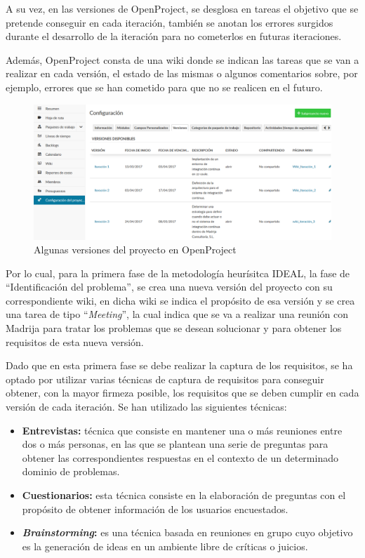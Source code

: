A su vez, en las versiones de OpenProject, se desglosa en tareas el objetivo que se pretende conseguir en cada iteración, también se anotan los errores surgidos durante el desarrollo de la iteración para no cometerlos en futuras iteraciones.

Además, OpenProject consta de una wiki donde se indican las tareas que se van a realizar en cada versión, el estado de las mismas o algunos comentarios sobre, por ejemplo, errores que se han cometido para que no se realicen en el futuro.

\begin{figure}[!h]
\centering
   \includegraphics[width=16cm]{OpenProjectVersiones.PNG}
\caption{Algunas versiones del proyecto en OpenProject}
\end{figure}

Por lo cual, para la primera fase de la metodología heurísitca IDEAL, la fase de ``Identificación del problema'', se crea una nueva versión del proyecto con su correspondiente wiki, en dicha wiki se indica el propósito de esa versión y se crea una tarea de tipo ``\textit{Meeting}'', la cual indica que se va a realizar una reunión con \ac{Madrija} para tratar los problemas que se desean solucionar y para obtener los requisitos de esta nueva versión.

\newpage

Dado que en esta primera fase se debe realizar la captura de los requisitos, se ha optado por utilizar varias técnicas de captura de requisitos para conseguir obtener, con la mayor firmeza posible, los requisitos que se deben cumplir en cada versión de cada iteración. Se han utilizado las siguientes técnicas:
\begin{itemize}
	\item \textbf{Entrevistas\cite{toro2000metodologia}: } técnica que consiste en mantener una o más reuniones entre dos o más personas, en las que se plantean una serie de preguntas para obtener las correspondientes respuestas en el contexto de un determinado dominio de problemas.
	\item \textbf{Cuestionarios\cite{monsalve2010evolucion}: } esta técnica consiste en la elaboración de preguntas con el propósito de obtener información de los usuarios encuestados.
	\item \textbf{\textit{Brainstorming}: } es una técnica basada en reuniones en grupo cuyo objetivo es la generación de ideas en un ambiente libre de críticas o juicios.
\end{itemize}

